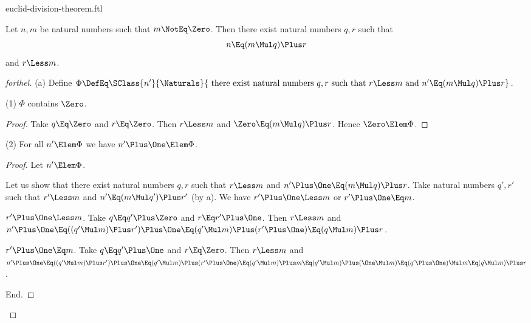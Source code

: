 \documentclass{stex}
\begin{document}
\begin{smodule}{euclid-division-theorem.ftl}



\begin{theorem*}[forthel,title=Euclid's Division Theorem: Existence,name=Euclid Division Existence]
  Let $n, m$ be natural numbers such that $m \NotEq \Zero$.
  Then there exist natural numbers $q, r$ such that
  \[n \Eq (m \Mul q) \Plus r\]
  and $r \Less m$.
\end{theorem*}
\begin{proof}[forthel]
  (a) Define $\Phi \DefEq \SClass{n'}{\Naturals}{\text{ there exist natural numbers }q, r\text{ such that }r \Less m\text{ and }n' \Eq (m \Mul q) \Plus r}$.

  (1) $\Phi$ contains $\Zero$.
  \begin{proof}
    Take $q \Eq \Zero$ and $r \Eq \Zero$.
    Then $r \Less m$ and $\Zero \Eq (m \Mul q) \Plus r$.
    Hence $\Zero \Elem \Phi$.
  \end{proof}

  (2) For all $n' \Elem \Phi$ we have $n' \Plus \One \Elem \Phi$.
  \begin{proof}
    Let $n' \Elem \Phi$.

    Let us show that there exist natural numbers $q, r$ such that $r \Less m$ and $n' \Plus \One \Eq (m \Mul q) \Plus r$.
      Take natural numbers $q', r'$ such that $r' \Less m$ and $n' \Eq (m \Mul q') \Plus r'$ (by a).
      We have $r' \Plus \One \Less m$ or $r' \Plus \One \Eq m$.

      \begin{case}{$r' \Plus \One \Less m$.}
        Take $q \Eq q' \Plus \Zero$ and $r \Eq r' \Plus \One$. %
        Then $r \Less m$ and $n' \Plus \One
          \Eq ((q' \Mul m) \Plus r') \Plus \One
          \Eq (q' \Mul m) \Plus (r' \Plus \One)
          \Eq (q \Mul m) \Plus r$.
      \end{case}

      \begin{case}{$r' \Plus \One \Eq m$.}
        Take  $q \Eq q' \Plus \One$ and $r \Eq \Zero$.
        Then $r \Less m$ and
        $n' \Plus \One
          \Eq ((q' \Mul m) \Plus r') \Plus \One
          \Eq (q' \Mul m) \Plus (r' \Plus \One)
          \Eq (q' \Mul m) \Plus m
          \Eq (q' \Mul m) \Plus (\One \Mul m)
          \Eq (q' \Plus \One) \Mul m
          \Eq (q \Mul m) \Plus r$.
      \end{case}
    End.


\end{proof}
\end{proof}
\end{smodule}
\end{document}
